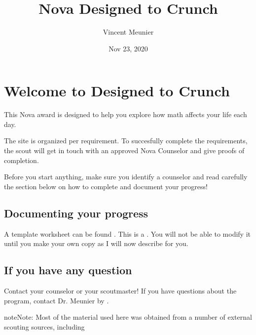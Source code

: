 \documentclass[letterpaper,10pt,english]{sphinxmanual}
\title{Nova \sphinxhyphen{} Designed to Crunch}
\date{Nov 23, 2020}
\author{Vincent Meunier}
\begin{document}
\pagestyle{empty}
\sphinxmaketitle
\pagestyle{plain}
\sphinxtableofcontents
\pagestyle{normal}
\label{\detokenize{index::doc}}



\chapter{Welcome to Designed to Crunch}
\label{\detokenize{introduction:welcome-to-designed-to-crunch}}\label{\detokenize{introduction:introduction}}\label{\detokenize{introduction::doc}}
This Nova award is designed to help you explore how math affects your life each day.

The site is organized per requirement. To succesfully complete the requirements, the scout will get in touch with an approved Nova Counselor and give proofs of completion.

Before you start anything, make sure you identify a counselor and read carefully the section below on how to complete and document your progress!


\section{Documenting your progress}
\label{\detokenize{introduction:documenting-your-progress}}
A template worksheet can be found . This is a . You will not be able to modify it until you make your own copy as I will now describe for you.


\section{If you have any question}
\label{\detokenize{introduction:if-you-have-any-question}}
Contact your counselor or your scoutmaster! If you have questions about the program, contact Dr. Meunier  by .


\begin{sphinxadmonition}{note}{Note:}
Most of the material used here was obtained from a number of external scouting sources, including 
\end{sphinxadmonition}
\end{document}

